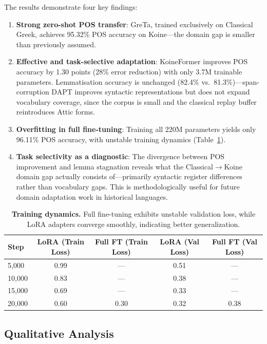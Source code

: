 \documentclass[11pt,letterpaper]{article}
\newcommand{\tblhead}{\rowcolor{marine!12}}
\begin{document}
The results demonstrate four key findings:
\begin{enumerate}
    \item \textbf{Strong zero-shot POS transfer}: GreTa, trained exclusively on Classical Greek, achieves 95.32\% POS accuracy on Koine---the domain gap is smaller than previously assumed.

    \item \textbf{Effective and task-selective adaptation}: KoineFormer improves POS accuracy by 1.30 points (28\% error reduction) with only 3.7M trainable parameters. Lemmatisation accuracy is unchanged (82.4\% vs.\ 81.3\%)---span-corruption DAPT improves syntactic representations but does not expand vocabulary coverage, since the corpus is small and the classical replay buffer reintroduces Attic forms.

    \item \textbf{Overfitting in full fine-tuning}: Training all 220M parameters yields only 96.11\% POS accuracy, with unstable training dynamics (Table~\ref{tab:loss}).

    \item \textbf{Task selectivity as a diagnostic}: The divergence between POS improvement and lemma stagnation reveals what the Classical$\rightarrow$Koine domain gap actually consists of---primarily syntactic register differences rather than vocabulary gaps. This is methodologically useful for future domain adaptation work in historical languages.
\end{enumerate}

\begin{table}[H]
\centering
\small
\begin{tabular}{lcccc}
\toprule
\tblhead\textbf{Step} & \textbf{LoRA (Train Loss)} & \textbf{Full FT (Train Loss)} & \textbf{LoRA (Val Loss)} & \textbf{Full FT (Val Loss)} \\
\midrule
5,000 & 0.99 & --- & 0.51 & --- \\
10,000 & 0.83 & --- & 0.38 & --- \\
15,000 & 0.69 & --- & 0.33 & --- \\
20,000 & 0.60 & 0.30 & 0.32 & 0.38 \\
\bottomrule
\end{tabular}
\caption{\textbf{Training dynamics.} Full fine-tuning exhibits unstable validation loss, while LoRA adapters converge smoothly, indicating better generalization.}
\label{tab:loss}
\end{table}

\subsection{Qualitative Analysis}
\end{document}
